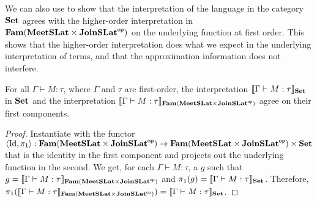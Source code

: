 We can also use  to show that the
interpretation of the language in the category $\mathbf{Set}$ agrees with the
higher-order interpretation in $\mathbf{Fam}(\mathbf{MeetSLat} \times \mathbf{JoinSLat}^{\mathsf{op}})$
on the underlying function at first order. This shows that the
higher-order interpretation does what we expect in the underlying
interpretation of terms, and that the approximation information does
not interfere.

\begin{theorem}
  \label{thm:underlying-interp-equal} For all
  $\Gamma \vdash M : \tau$, where $\Gamma$ and $\tau$ are first-order,
  the interpretation $\llbracket \Gamma \vdash M : \tau \rrbracket_{\mathbf{Set}}$ in $\mathbf{Set}$
  and the interpretation
  $\llbracket \Gamma \vdash M : \tau \rrbracket_{\mathbf{Fam}(\mathbf{MeetSLat} \times
    \mathbf{JoinSLat}^{\mathsf{op}})}$ agree on their first components.
\end{theorem}

\begin{proof}
  Instantiate  with the functor
  $\langle \mathrm{Id} , \pi_1 \rangle : \mathbf{Fam}(\mathbf{MeetSLat} \times
  \mathbf{JoinSLat}^{\mathsf{op}}) \to \mathbf{Fam}(\mathbf{MeetSLat} \times \mathbf{JoinSLat}^{\mathsf{op}}) \times \mathbf{Set}$
  that is the identity in the first component and projects out the
  underlying function in the second. We get, for each
  $\Gamma \vdash M : \tau$, a $g$ such that
  $g = \llbracket \Gamma \vdash M : \tau \rrbracket_{\mathbf{Fam}(\mathbf{MeetSLat} \times
    \mathbf{JoinSLat}^{\mathsf{op}})}$ and
  $\pi_1(g) = \llbracket \Gamma \vdash M : \tau \rrbracket_{\mathbf{Set}}$. Therefore,
  $\pi_1(\llbracket \Gamma \vdash M : \tau \rrbracket_{\mathbf{Fam}(\mathbf{MeetSLat} \times
    \mathbf{JoinSLat}^{\mathsf{op}})}) = \llbracket \Gamma \vdash M : \tau \rrbracket_{\mathbf{Set}}$.
\end{proof}
